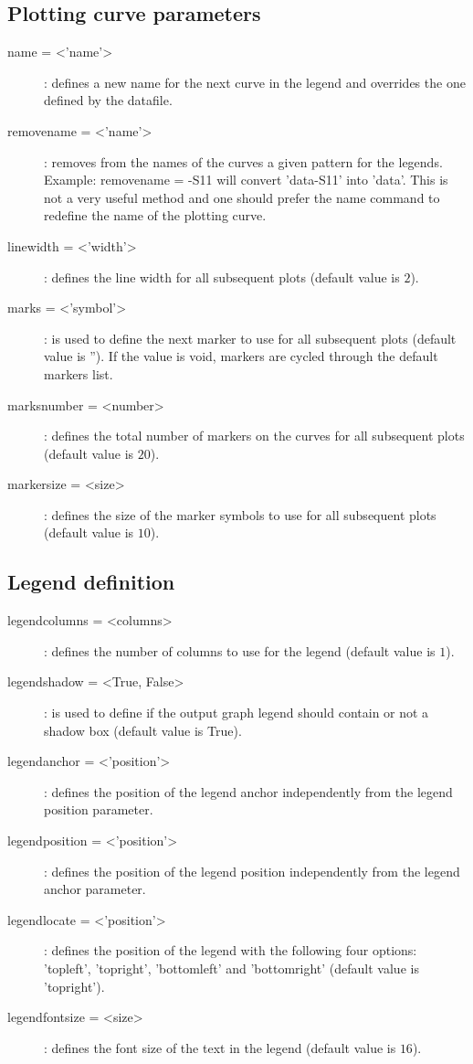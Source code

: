 \subsection{Plotting curve parameters}
\begin{description}
\item [name = <'name'>]: defines a new name for the next curve in the legend and overrides the one defined by the datafile.
\item [removename = <'name'>]: removes from the names of the curves a given pattern for the legends. Example: \textsf{removename} = -S11 will convert 'data-S11' into 'data'. This is not a very useful method and one should prefer the \textsf{name} command to redefine the name of the plotting curve.
\item [linewidth = <'width'>]: defines the line width for all subsequent plots (default value is $2$). 
\item [marks = <'symbol'>]: is used to define the next marker to use for all subsequent plots (default value is ''). If the value is void, markers are cycled through the default markers list.
\item [marksnumber = <number>]: defines the total number of markers on the curves for all subsequent plots (default value is $20$).
\item [markersize = <size>]: defines the size of the marker symbols to use for all subsequent plots (default value is $10$).
\end{description}

\subsection{Legend definition}
\begin{description}
\item [legendcolumns = <columns>]: defines the number of columns to use for the legend (default value is $1$).
\item [legendshadow = <True, False>]: is used to define if the output graph legend should contain or not a shadow box (default value is True).
\item [legendanchor = <'position'>]: defines the position of the legend anchor independently from the legend position parameter.
\item [legendposition = <'position'>]: defines the position of the legend position independently from the legend anchor parameter.
\item [legendlocate = <'position'>]: defines the position of the legend with the following four options: 'topleft', 'topright', 'bottomleft' and 'bottomright' (default value is 'topright').
\item [legendfontsize = <size>]: defines the font size of the text in the legend (default value is $16$).
\end{description}

